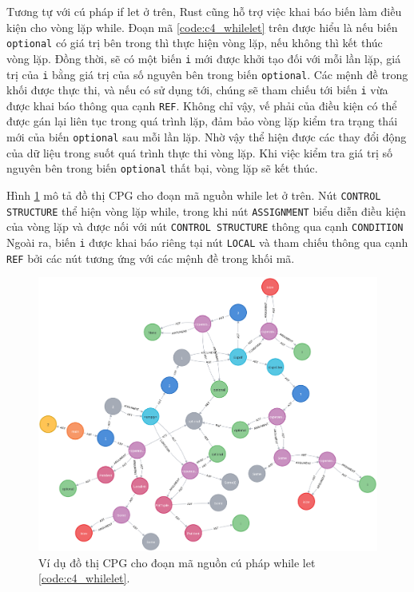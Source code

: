 Tương tự với cú pháp if let ở trên, Rust cũng hỗ trợ việc khai báo biến làm điều kiện cho vòng lặp while.
Đoạn mã \ref{code:c4_whilelet} trên được hiểu là nếu biến \texttt{optional} có giá trị bên trong thì thực hiện vòng lặp, nếu không thì kết thúc vòng lặp.
Đồng thời, sẽ có một biến \texttt{i} mới được khởi tạo đối với mỗi lần lặp, giá trị của \texttt{i} bằng giá trị của số nguyên bên trong biến \texttt{optional}.
Các mệnh đề trong khối được thực thi, và nếu có sử dụng tới, chúng sẽ tham chiếu tới biến \texttt{i} vừa được khai báo thông qua cạnh \texttt{REF}.
Không chỉ vậy, vế phải của điều kiện có thể được gán lại liên tục trong quá trình lặp, đảm bảo vòng lặp kiểm tra trạng thái mới của biến \texttt{optional} sau mỗi lần lặp.
Nhờ vậy thể hiện được các thay đổi động của dữ liệu trong suốt quá trình thực thi vòng lặp.
Khi việc kiểm tra giá trị số nguyên bên trong biến \texttt{optional} thất bại, vòng lặp sẽ kết thúc.

Hình \ref{img:c4_cpg_whilelet} mô tả đồ thị CPG cho đoạn mã nguồn while let ở trên.
Nút \texttt{CONTROL STRUCTURE} thể hiện vòng lặp while, trong khi nút \texttt{ASSIGNMENT} biểu diễn điều kiện của vòng lặp và được nối với nút \texttt{CONTROL STRUCTURE} thông qua cạnh \texttt{CONDITION}
Ngoài ra, biến \texttt{i} được khai báo riêng tại nút \texttt{LOCAL} và tham chiếu thông qua cạnh \texttt{REF} bởi các nút tương ứng với các mệnh đề trong khối mã.

\begin{figure}[H]
    \includegraphics[width=1\columnwidth]{figures/c4/c4_whilelet.png}
    \centering
    \caption{Ví dụ đồ thị CPG cho đoạn mã nguồn cú pháp while let \ref{code:c4_whilelet}.}
    \label{img:c4_cpg_whilelet}
\end{figure}


